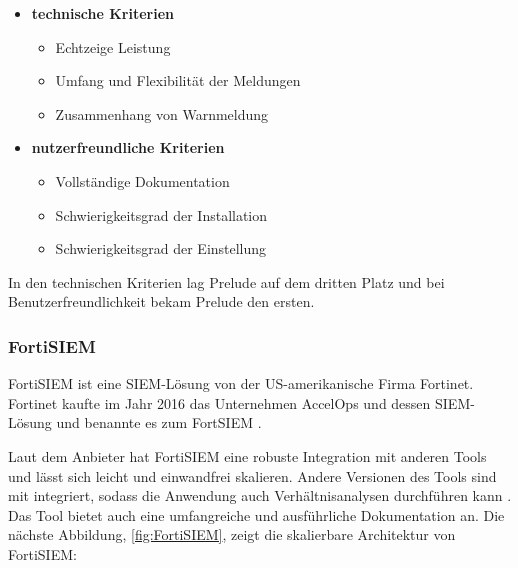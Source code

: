 \begin{itemize}[noitemsep]
   \item \textbf{technische Kriterien}
   \begin{itemize}[noitemsep]
      \item Echtzeige Leistung %
      \item Umfang und Flexibilität der Meldungen %
      \item Zusammenhang von Warnmeldung %
   \end{itemize}

   \item \textbf{nutzerfreundliche Kriterien}
   \begin{itemize}[noitemsep]
      \item Vollständige Dokumentation %
      \item Schwierigkeitsgrad der Installation %
      \item Schwierigkeitsgrad der Einstellung %
   \end{itemize}
\end{itemize}

In den technischen Kriterien lag Prelude auf dem dritten Platz und bei Benutzerfreundlichkeit bekam Prelude den ersten.



\newpage
\subsubsection{FortiSIEM}
FortiSIEM ist eine \gls{SIEM}-Lösung von der US-amerikanische Firma Fortinet. Fortinet kaufte im Jahr 2016 das Unternehmen AccelOps und dessen \gls{SIEM}-Lösung und benannte es zum FortSIEM \citep{Fortinet_Press}.

Laut dem Anbieter hat FortiSIEM eine robuste Integration mit anderen Tools und lässt sich leicht und einwandfrei skalieren. Andere Versionen des Tools sind mit  integriert, sodass die Anwendung auch Verhältnisanalysen durchführen kann \citep{Fortinet_Solutions}. Das Tool bietet auch eine umfangreiche und ausführliche Dokumentation an. Die nächste Abbildung, \ref{fig:FortiSIEM}, zeigt die skalierbare Architektur von FortiSIEM:

